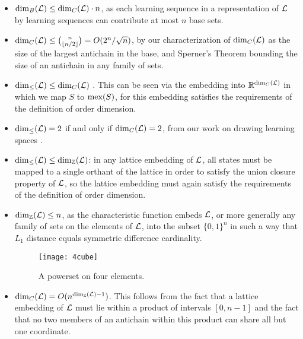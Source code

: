 \documentclass[11pt]{llncs}
\def\Ree{\ensuremath{\Bbb R}}
\def\Zee{\ensuremath{\Bbb Z}}
\begin{document}
{\begin{itemize}
\item ${\rm dim}_B({\cal L})\le{\rm dim}_C({\cal L})\cdot n$, as each learning sequence in a representation of $\cal L$ by learning sequences can contribute at most $n$ base sets.

\item ${\rm dim}_C({\cal L})\le{n\choose\lfloor n/2\rfloor}=O(2^n/\sqrt n)$, by our characterization of ${\rm dim}_C({\cal L})$ as the size of the largest antichain in the base, and Sperner's Theorem bounding the size of an antichain in any family of sets.

\item ${\rm dim}_\le({\cal L})\le{\rm dim}_C({\cal L})$ \citep{KorLovSch-91}. This can be seen via the embedding into $\Ree^{{\rm dim}_C({\cal L})}$ in which we map $S$ to ${\rm mex}(S)$, for this embedding satisfies the requirements of the definition of order dimension.

\item ${\rm dim}_\le({\cal L})=2$ if and only if ${\rm dim}_C({\cal L})=2$, from our work on drawing learning spaces \citep{eppst06}.

\item ${\rm dim}_\le({\cal L})\le{\rm dim}_\Zee({\cal L})$: in any lattice embedding of $\cal L$, all states must be mapped to a single orthant of the lattice in order to satisfy the union closure property of $\cal L$, so the lattice embedding must again satisfy the requirements of the definition of order dimension.

\item ${\rm dim}_\Zee({\cal L})\le n$, as the characteristic function embeds $\cal L$, or more generally any family of sets on the elements of $\cal L$, into the subset $\{0,1\}^{n}$ in such a way that $L_1$ distance equals symmetric difference cardinality.

\begin{figure}[t]
\centering\texttt{[image: 4cube]}
\caption{A powerset on four elements.}
\label{fig:4cube}
\end{figure}

\item ${\rm dim}_C({\cal L})=O(n^{{\rm dim}_\Zee({\cal L})-1})$.
This follows from the fact that a lattice embedding of $\cal L$ must lie within a product of intervals $[0,n-1]$ and the fact that no two members of an antichain within this product can share all but one coordinate.
\end{itemize}

}
\end{document}
